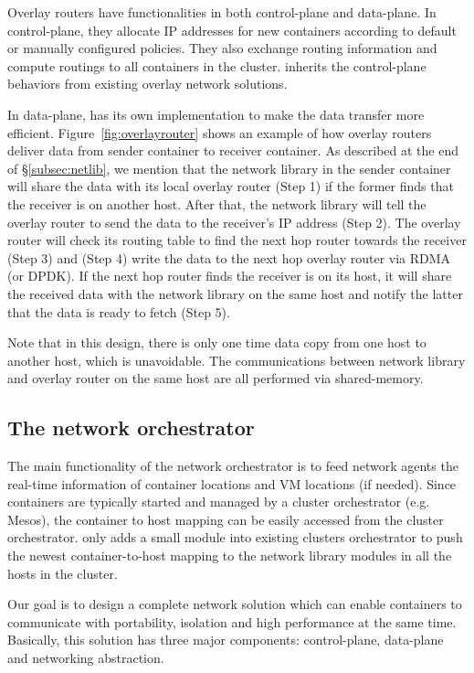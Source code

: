 Overlay routers have functionalities in both control-plane and data-plane.
In control-plane, they allocate IP addresses for new containers according to
default or manually configured policies. They also exchange routing information
and compute routings to all containers in the cluster. \sysname inherits 
the control-plane behaviors from existing overlay network solutions.

In data-plane, \sysname has its own implementation to make the data transfer
more efficient. Figure~\ref{fig:overlayrouter} shows an example of how 
overlay routers deliver data from sender container to receiver container.
As described at the end of \S\ref{subsec:netlib}, we mention that 
the network library in the sender container will share the data with
its local overlay router (Step 1) if the former finds that the receiver 
is on another host. After that, the network library will tell
the overlay router to send the data to the receiver's IP address (Step 2).
The overlay router will check its routing table to find the next hop router
towards the receiver (Step 3) and (Step 4) write the data to the next hop overlay
router via RDMA (or DPDK). If the next hop router finds the receiver is on its
host, it will share the received data with the network library on the same host
and notify the latter that the data is ready to fetch (Step 5).

Note that in this design, there is only one time data copy from one host
to another host, which is unavoidable. The communications between network library
and overlay router on the same host are all performed via shared-memory.

\subsection{The network orchestrator}

The main functionality of the network orchestrator is to feed network agents
the real-time information of container locations and VM locations (if needed).
Since containers are typically started and managed by a cluster orchestrator
(e.g. Mesos), the container to host mapping can be easily accessed
from the cluster orchestrator. \sysname only adds a small module into 
existing clusters orchestrator to push the newest container-to-host mapping
to the network library modules in all the hosts in the cluster. 

\iffalse

Our goal is to design a complete network solution which can enable containers
to communicate with portability, isolation and high performance at the same time.
Basically, this solution has three major components: control-plane, data-plane 
and networking abstraction. 


